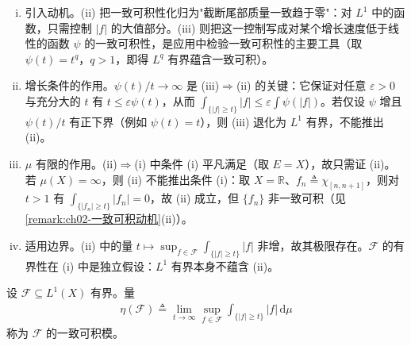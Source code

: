 \documentclass[../../main.tex]{subfiles}%
\begin{document}
\begin{remark}\label{remark:ch02-有界一致可积等价}
\begin{enumerate}[(i)]
\item 引入动机。(ii) 把一致可积性化归为"截断尾部质量一致趋于零"：对 $L^1$ 中的函数，只需控制 $|f|$ 的大值部分。(iii) 则把这一控制写成对某个增长速度低于线性的函数 $\psi$ 的一致可积性，是应用中检验一致可积性的主要工具（取 $\psi(t)=t^q$，$q>1$，即得 $L^q$ 有界蕴含一致可积）。
\item 增长条件的作用。$\psi(t)/t\to\infty$ 是 (iii)$\Rightarrow$(ii) 的关键：它保证对任意 $\varepsilon>0$ 与充分大的 $t$ 有 $t\leqslant\varepsilon\psi(t)$，从而 $\int_{\{|f|\geqslant t\}}|f|\leqslant\varepsilon\int\psi(|f|)$。若仅设 $\psi$ 增且 $\psi(t)/t$ 有正下界（例如 $\psi(t)=t$），则 (iii) 退化为 $L^1$ 有界，不能推出 (ii)。
\item $\mu$ 有限的作用。(ii)$\Rightarrow$(i) 中条件 (i) 平凡满足（取 $E=X$），故只需证 (ii)。若 $\mu(X)=\infty$，则 (ii) 不能推出条件 (i)：取 $X=\mathbb R$、$f_n\triangleq\chi_{[n,n+1]}$，则对 $t>1$ 有 $\int_{\{|f_n|\geqslant t\}}|f_n|=0$，故 (ii) 成立，但 $\{f_n\}$ 非一致可积（见\cref{remark:ch02-一致可积动机}(ii)）。
\item 适用边界。(ii) 中的量 $t\mapsto\sup_{f\in\mathscr F}\int_{\{|f|\geqslant t\}}|f|$ 非增，故其极限存在。$\mathscr F$ 的有界性在 (i) 中是独立假设：$L^1$ 有界本身不蕴含 (ii)。
\end{enumerate}
\end{remark}

\begin{definition}\label{definition:ch02-一致可积模}
设 $\mathscr F\subseteq L^1(X)$ 有界。量
\begin{align}
\eta(\mathscr F)\triangleq \lim_{t\to\infty}\sup_{f\in\mathscr F}\int_{\{|f|\geqslant t\}}|f|\,\mathrm{d}\mu \label{align:ch02-2.62}
\end{align}
称为 $\mathscr F$ 的一致可积模。
\end{definition}
\end{document}
